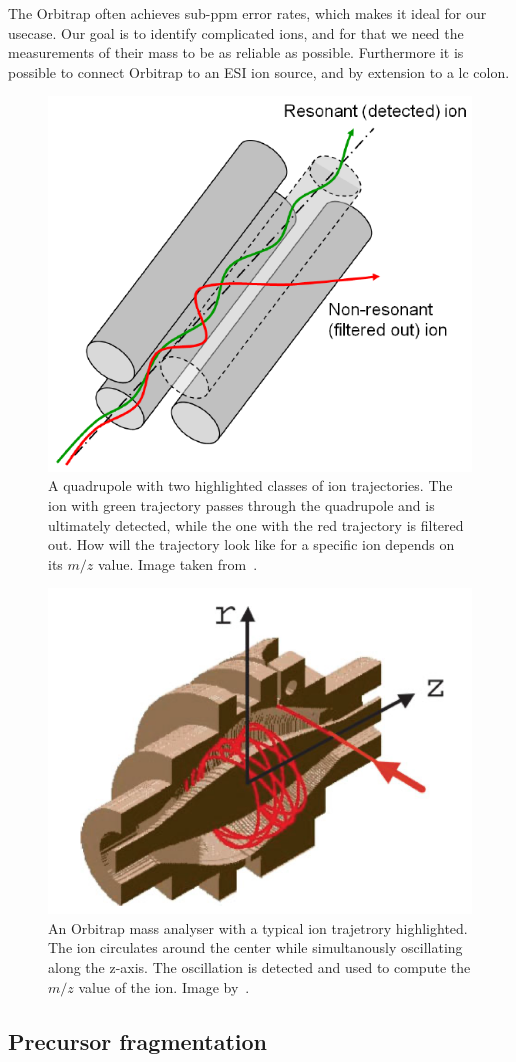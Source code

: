 \begin{description}
    The Orbitrap often achieves sub-ppm error rates, which makes it ideal for our usecase. Our goal is to identify complicated ions, and for that we need the measurements of their mass to be as reliable as possible. Furthermore it is possible to connect Orbitrap to an ESI ion source, and by extension to a \gls*{lc} colon.
\end{description}

\begin{figure}
  \centering
  \includegraphics[width=.4\linewidth]{img/quadrupole.png}
  \caption{A quadrupole with two highlighted classes of ion trajectories. The ion with green trajectory passes through the quadrupole and is ultimately detected, while the one with the red trajectory is filtered out. How will the trajectory look like for a specific ion depends on its \(m/z\) value. Image taken from~\citet{2021Mass}.}\label{fig:quadrupole}
\end{figure}

\begin{figure}
  \centering
  \includegraphics[width=.5\linewidth]{img/orbitrap.png}
  \caption{An Orbitrap mass analyser with a typical ion trajetrory highlighted. The ion circulates around the center while simultanously oscillating along the z-axis. The oscillation is detected and used to compute the \(m/z\) value of the ion. Image by~\citet{hu2005orbitrap}.}\label{fig:orbitrap}
\end{figure}

\subsection{Precursor fragmentation}\label{sec:fragmentation}

